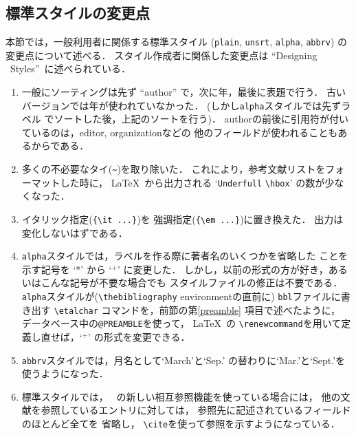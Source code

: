 \subsection{標準スタイルの変更点}

本節では，一般利用者に関係する標準スタイル
({\tt plain}, {\tt unsrt}, {\tt alpha}, {\tt abbrv})
の変更点について述べる．
スタイル作成者に関係した変更点は
``Designing \BibTeX\ Styles''~\cite{btxhak}に述べられている．

\begin{enumerate}

\item
一般にソーティングは先ず ``author'' で，次に年，最後に表題で行う．
古いバージョンでは年が使われていなかった．
(しかし{\tt alpha}スタイルでは先ずラベル
でソートした後，上記のソートを行う)．
authorの前後に引用符が付いているのは，editor, organizationなどの
他のフィールドが使われることもあるからである．

\item
多くの不必要なタイ(\verb|~|)を取り除いた．
これにより，参考文献リストをフォーマットした時に，
\LaTeX\ から出力される `\hbox{\tt Underfull} \verb|\hbox|'
の数が少なくなった．

\item
イタリック指定(\hbox{\verb|{\it ...}|})を
強調指定(\hbox{\verb|{\em ...}|})に置き換えた．
出力は変化しないはずである．

\item
{\tt alpha}スタイルでは，ラベルを作る際に著者名のいくつかを省略した
ことを示す記号を `*' から `$^{+}$' に変更した．
しかし，以前の形式の方が好き，あるいはこんな記号が不要な場合でも
スタイルファイルの修正は不要である．
{\tt alpha}スタイルが(\verb|\thebibliography| environmentの直前に)
{\tt bbl}ファイルに書き出す \verb|\etalchar|
コマンドを，前節の第\ref{preamble} 項目で述べたように，
データベース中の{\tt @PREAMBLE}を使って，
\LaTeX\ の \verb|\renewcommand|を用いて定義し直せば，`$^{+}$'
の形式を変更できる．

\item
{\tt abbrv}スタイルでは，月名として`March'と`Sep.'
の替わりに`Mar.'と`Sept.'を使うようになった．

\item
標準スタイルでは，
\BibTeX\ の新しい相互参照機能を使っている場合には，
他の文献を参照しているエントリに対しては，
参照先に記述されているフィールドのほとんど全てを
省略し， \verb|\cite|を使って参照を示すようになっている．


\end{enumerate}
